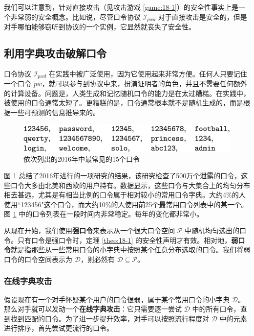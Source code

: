 我们可以注意到，针对直接攻击（见攻击游戏 \ref{game:18-1}）的安全性事实上是一个非常弱的安全概念。比如说，尽管口令协议 $\mathcal{I}_{pwd}$ 对于直接攻击是安全的，但是对手哪怕能够窃听到协议的一个实例，它显然就丧失了安全性。

\subsection{利用字典攻击破解口令}

口令协议 $\mathcal{I}_{pwd}$ 在实践中被广泛使用，因为它使用起来非常方便。任何人只要记住一个口令 $pw$，就可以参与到协议中来，扮演证明者的角色，并且不需要任何额外的计算设备。问题是，人类生成和记忆随机口令的能力是在太过糟糕。在实践中，被使用的口令通常太短了。更糟糕的是，口令通常根本就不是随机生成的，而是根据一些可预测的信息推导来的。

\begin{figure}
    \centering
    \includegraphics[width=0.6\linewidth]{figures/chapter18/fig3.png}
    \caption{依次列出的2016年中最常见的15个口令}
    \label{fig:18-3}
\end{figure}

图 \ref{fig:18-3} 总结了2016年进行的一项研究的结果，该研究检查了500万个泄露的口令，这些口令大多由北美和西欧的用户持有。数据显示，这些口令与大集合上的均匀分布相去甚远，尤其是有相当比例的口令属于相对较小的常用口令字典。大约4\%的人使用``123456"这个口令，而大约10\%的人使用前25个最常用口令列表中的某一个。图 \ref{fig:18-3} 中的口令列表在一段时间内非常稳定。每年的变化都非常小。

从现在开始，我们使用\textbf{强口令}来表示从一个很大口令空间 $\mathcal{P}$ 中随机均匀选出的口令。只有口令是强口令时，定理 \ref{theo:18-1} 的安全性声明才有效。相对地，\textbf{弱口令}就是指那些从一些常用口令的小字典中按照某个任意分布选取的口令。我们将弱口令的口令空间表示为 $\mathcal{D}$，则必然有 $\mathcal{D}\subseteq\mathcal{P}$。

\subsubsection{在线字典攻击}

假设现在有一个对手怀疑某个用户的口令很弱，属于某个常用口令的小字典 $\mathcal{D}$。那么对手就可以发动一个\textbf{在线字典攻击}：它只需要逐一尝试 $\mathcal{D}$ 中的所有口令，直到找到匹配的口令。为了进一步提升效率，对手可以按照流行程度对 $\mathcal{D}$ 中的元素进行排序，首先尝试更流行的口令。

